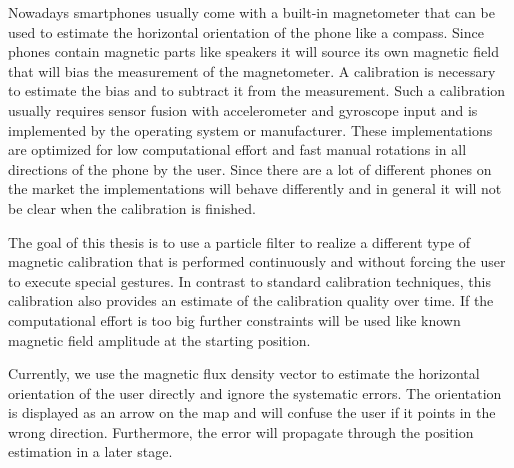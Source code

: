 Nowadays smartphones usually come with a built-in magnetometer that can be used to estimate the horizontal orientation of the phone like a compass. Since phones contain magnetic parts like speakers it will source its own magnetic field that will bias the measurement of the magnetometer. A calibration is necessary to estimate the bias and to subtract it from the measurement. Such a calibration usually requires sensor fusion with accelerometer and gyroscope input and is implemented by the operating system or manufacturer. These implementations are optimized for low computational effort and fast manual rotations in all directions of the phone by the user. Since there are a lot of different phones on the market the implementations will behave differently and in general it will not be clear when the calibration is finished.

The goal of this thesis is to use a particle filter to realize a different type of magnetic calibration that is performed continuously and without forcing the user to execute special gestures. In contrast to standard calibration techniques, this calibration also provides an estimate of the calibration quality over time. If the computational effort is too big further constraints will be used like known magnetic field amplitude at the starting position.

Currently, we use the magnetic flux density vector to estimate the horizontal orientation of the user directly and ignore the systematic errors. The orientation is displayed as an arrow on the map and will confuse the user if it points in the wrong direction. Furthermore, the error will propagate through the position estimation in a later stage.
